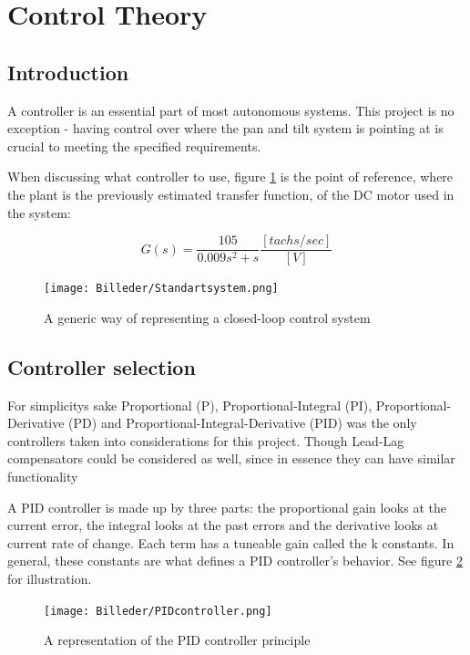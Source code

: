 \newpage

\section{Control Theory}
\subsection{Introduction}
A controller is an essential part of most autonomous systems. This project is no exception - having control over where the pan and tilt system is pointing at is crucial to meeting the specified requirements.

When discussing what controller to use, figure \ref{fig:Standartsystem} is the point of reference, where the plant is the previously estimated transfer function, of the DC motor used in the system:

\begin{equation}
G(s)=\frac{105}{0.009s^2+s} \frac{[tachs/sec]}{[V]}
\end{equation}

\begin{figure}[h!]
\centering
\texttt{[image: Billeder/Standartsystem.png]}
\caption{ A generic way of representing a closed-loop control system }
\label{fig:Standartsystem}
\end{figure}

\newpage

\subsection{Controller selection}
For simplicitys sake Proportional (P), Proportional-Integral (PI), Proportional-Derivative (PD) and Proportional-Integral-Derivative (PID) was the only controllers taken into considerations for this project. Though Lead-Lag compensators could be considered as well, since in essence they can have similar functionality\par

A PID controller is made up by three parts: the proportional gain looks at the current error, the integral looks at the past errors and the derivative looks at current rate of change. Each term has a tuneable gain called the k constants. In general, these constants are what defines a PID controller’s behavior. See figure \ref{fig:PID controller} for illustration. 

\begin{figure}[h!]
\centering
\texttt{[image: Billeder/PIDcontroller.png]}
\caption{ A representation of the PID controller principle }
\label{fig:PID controller}
\end{figure}

